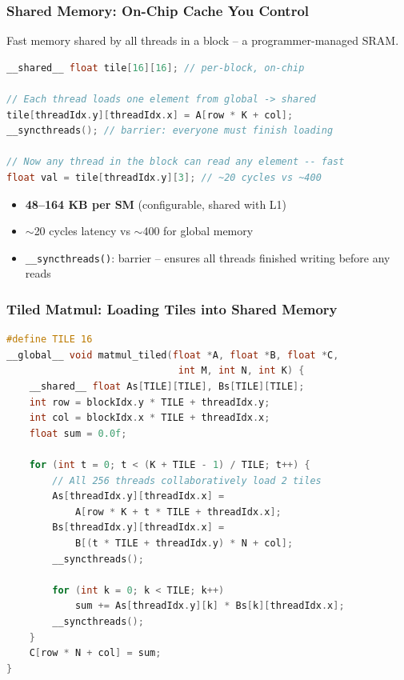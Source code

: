 \documentclass[aspectratio=169]{beamer}
\begin{document}
\begin{frame}[fragile]
	\frametitle{Shared Memory: On-Chip Cache You Control}
	Fast memory shared by all threads in a block -- a programmer-managed SRAM.
	\vspace{0.3em}
	\begin{lstlisting}[language=C, title={\color{codegreen}Declaration and usage}]
__shared__ float tile[16][16]; // per-block, on-chip

// Each thread loads one element from global -> shared
tile[threadIdx.y][threadIdx.x] = A[row * K + col];
__syncthreads(); // barrier: everyone must finish loading

// Now any thread in the block can read any element -- fast
float val = tile[threadIdx.y][3]; // ~20 cycles vs ~400
	\end{lstlisting}
	\vspace{0.3em}
	\begin{itemize}
		\item \textbf{48--164 KB per SM} (configurable, shared with L1)
		\item $\sim$20 cycles latency vs $\sim$400 for global memory
		\item \texttt{\_\_syncthreads()}: barrier -- ensures all threads finished writing before any reads
	\end{itemize}
\end{frame}

\begin{frame}[fragile]
	\frametitle{Tiled Matmul: Loading Tiles into Shared Memory}
	\begin{lstlisting}[language=C]
#define TILE 16
__global__ void matmul_tiled(float *A, float *B, float *C,
                              int M, int N, int K) {
    __shared__ float As[TILE][TILE], Bs[TILE][TILE];
    int row = blockIdx.y * TILE + threadIdx.y;
    int col = blockIdx.x * TILE + threadIdx.x;
    float sum = 0.0f;

    for (int t = 0; t < (K + TILE - 1) / TILE; t++) {
        // All 256 threads collaboratively load 2 tiles
        As[threadIdx.y][threadIdx.x] =
            A[row * K + t * TILE + threadIdx.x];
        Bs[threadIdx.y][threadIdx.x] =
            B[(t * TILE + threadIdx.y) * N + col];
        __syncthreads();

        for (int k = 0; k < TILE; k++)
            sum += As[threadIdx.y][k] * Bs[k][threadIdx.x];
        __syncthreads();
    }
    C[row * N + col] = sum;
}
	\end{lstlisting}
\end{frame}
\end{document}
